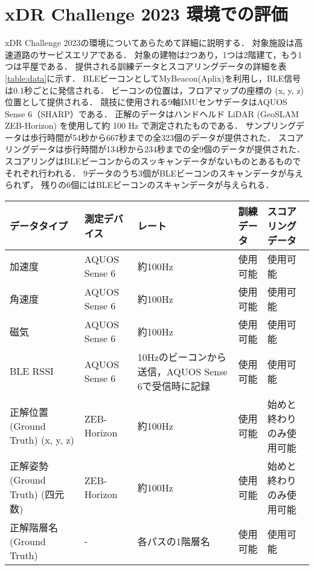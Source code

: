 
\section{xDR Challenge 2023 環境での評価}

xDR Challenge 2023の環境についてあらためて詳細に説明する．
対象施設は高速道路のサービスエリアである．
対象の建物は2つあり，1つは2階建て，もう1つは平屋である．
提供される訓練データとスコアリングデータの詳細を表\ref{table:data}に示す．
BLEビーコンとしてMyBeacon(Aplix)\cite{beacon-aplix}を利用し，BLE信号は0.1秒ごとに発信される．
ビーコンの位置は，フロアマップの座標の (x, y, z) 位置として提供される．
競技に使用される9軸IMUセンサデータはAQUOS Sense 6（SHARP）である．
正解のデータはハンドヘルド LiDAR (GeoSLAM ZEB-Horizon) を使用して約 100 Hz で測定されたものである．
サンプリングデータは歩行時間が54秒から667秒までの全323個のデータが提供された．
スコアリングデータは歩行時間が134秒から234秒までの全9個のデータが提供された．
スコアリングはBLEビーコンからのスッキャンデータがないものとあるものでそれぞれ行われる．
9データのうち3個がBLEビーコンのスキャンデータが与えられず，
残りの6個にはBLEビーコンのスキャンデータが与えられる．

\begin{table*}[ht]
    \centering
    \caption{提供データの概要}
    \begin{tabularx}{\textwidth}{|X|l|X|l|l|}
        \hline
        データタイプ & 測定デバイス & レート & 訓練データ & スコアリングデータ \\ \hline
        加速度 & AQUOS Sense 6 & 約100Hz & 使用可能 & 使用可能 \\ \hline
        角速度 & AQUOS Sense 6 & 約100Hz & 使用可能 & 使用可能 \\ \hline
        磁気 & AQUOS Sense 6 & 約100Hz & 使用可能 & 使用可能 \\ \hline
        BLE RSSI & AQUOS Sense 6 & 10Hzのビーコンから送信，AQUOS Sense 6で受信時に記録 & 使用可能 & 使用可能 \\ \hline
        正解位置 (Ground Truth) (x, y, z) & ZEB-Horizon & 約100Hz & 使用可能 & 始めと終わりのみ使用可能 \\ \hline
        正解姿勢 (Ground Truth) (四元数) & ZEB-Horizon & 約100Hz & 使用可能 & 始めと終わりのみ使用可能 \\ \hline
        正解階層名 (Ground Truth) & - & 各パスの1階層名 & 使用可能 & 使用可能 \\ \hline
    \end{tabularx}
    \label{table:data}
\end{table*}


